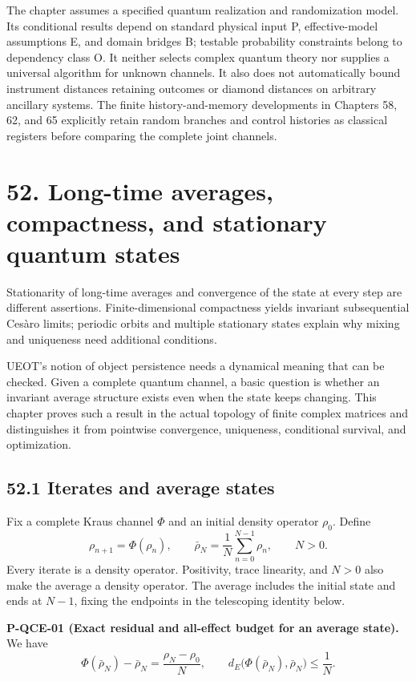 \documentclass[
  11pt,
  oneside]{book}
\begin{document}
The chapter assumes a specified quantum realization and randomization
model. Its conditional results depend on standard physical input P,
effective-model assumptions E, and domain bridges B; testable
probability constraints belong to dependency class O. It neither selects
complex quantum theory nor supplies a universal algorithm for unknown
channels. It also does not automatically bound instrument distances
retaining outcomes or diamond distances on arbitrary ancillary systems.
The finite history-and-memory developments in Chapters 58, 62, and 65
explicitly retain random branches and control histories as classical
registers before comparing the complete joint channels.

\chapter{52. Long-time averages, compactness, and stationary quantum
states}\label{ch-52}

Stationarity of long-time averages and convergence of the state at every
step are different assertions. Finite-dimensional compactness yields
invariant subsequential Cesàro limits; periodic orbits and multiple
stationary states explain why mixing and uniqueness need additional
conditions.

UEOT's notion of object persistence needs a dynamical meaning that can
be checked. Given a complete quantum channel, a basic question is
whether an invariant average structure exists even when the state keeps
changing. This chapter proves such a result in the actual topology of
finite complex matrices and distinguishes it from pointwise convergence,
uniqueness, conditional survival, and optimization.

\section{52.1 Iterates and average states}

Fix a complete Kraus channel \(\Phi\) and an initial density operator
\(\rho_0\). Define \[
\rho_{n+1}=\Phi(\rho_n),\qquad
\bar\rho_N=\frac1N\sum_{n=0}^{N-1}\rho_n,\qquad N>0.
\] Every iterate is a density operator. Positivity, trace linearity, and
\(N>0\) also make the average a density operator. The average includes
the initial state and ends at \(N-1\), fixing the endpoints in the
telescoping identity below.

\label{p-qce-01}{}

\textbf{P-QCE-01 (Exact residual and all-effect budget for an average
state).} We have \[
\Phi(\bar\rho_N)-\bar\rho_N=\frac{\rho_N-\rho_0}{N},
\qquad
d_E\bigl(\Phi(\bar\rho_N),\bar\rho_N\bigr)\le\frac1N.
\]
\end{document}
